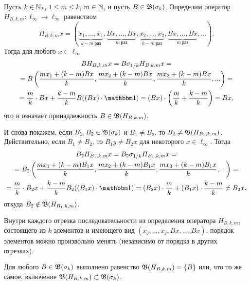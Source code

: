 \begin{example}
	Пусть $k\in \mathbb{N}_2$, $1 \leq m \leq k$, $m\in\mathbb{N}$, и пусть $B \in \mathfrak{B}(\sigma_k)$.
	Определим оператор $H_{B,k,m}:\ell_\infty \to \ell_\infty$ равенством
	\begin{equation}
		H_{B,k,m} x = (
			\underbrace{x_1, ..., x_1}_{k-m~\mbox{раз}}, \underbrace{Bx, ..., Bx}_{m~\mbox{раз}},
			\underbrace{x_2, ..., x_2}_{k-m~\mbox{раз}}, \underbrace{Bx, ..., Bx}_{m~\mbox{раз}},
			...)
		.
	\end{equation}
	Тогда для любого $x\in\ell_\infty$
	\begin{multline}
		B H_{B,k,m} x =
		B \sigma_{1/k} H_{B,k,m} x =
		\\=
		B\left(\dfrac{mx_1 + (k-m) Bx}{k}, \dfrac{mx_2 + (k-m) Bx}{k}, \dfrac{mx_3 + (k-m) Bx}{k}, ...\right)=
		\\=
		\dfrac{m}{k} \cdot Bx + \dfrac{k-m}{k} B ( (Bx)\cdot \one) =
		(Bx) \cdot \left(\dfrac m k + \dfrac{k-m}k \right) = Bx
		,
	\end{multline}
	что и означает принадлежность $B\in\mathfrak{B}(H_{B,k,m})$.

	И снова покажем, если $B_1, B_2 \in \mathfrak{B}(\sigma_k)$ и $B_1 \ne B_2$, то $B_2 \ne \mathfrak{B} (H_{B_1,k,m})$.
	Действительно, если $B_1 \ne B_2$, то $B_1y \ne B_2x$ для некоторого $x\in\ell_\infty$.
	Тогда
	\begin{multline}
		B_2 H_{B_1,k,m} x =
		B_2 \sigma_{1/k} H_{B_1,k,m} x =
		\\=
		B_2\left(\dfrac{mx_1 + (k-m) B_1x}{k}, \dfrac{mx_2 + (k-m) B_1x}{k}, \dfrac{mx_3 + (k-m) B_1x}{k}, ...\right)=
		\\=
		\dfrac{m}{k} \cdot B_2x + \dfrac{k-m}{k} B_2 ( (B_1x)\cdot \one) =
		(B_2x) \cdot \dfrac m k + (B_1x)\cdot \dfrac{k-m}k \ne B_2x
		,
	\end{multline}
	откуда $B_2\notin \mathfrak{B}(H_{B_1,k,m})$.
\end{example}

\begin{remark}
	Внутри каждого отрезка последовательности из определения оператора $H_{B,k,m}$,
	состоящего из $k$ элементов и имеющего вид $(x_j, ..., x_j, Bx, ..., Bx)$,
	порядок элементов можно произвольно менять (независимо от порядка в других отрезках).
\end{remark}

\begin{hypothesis}
	Для любого $B\in\mathfrak{B}(\sigma_k)$ выполнено равенство $\mathfrak{B}(H_{B,k,m}) = \{B\}$ или, что то же самое,
	включение $\mathfrak{B}(H_{B,k,m}) \subset \mathfrak{B}(\sigma_k)$.
\end{hypothesis}

